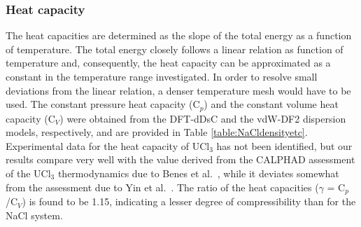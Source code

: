 \documentclass[preprint,3p,10pt,onecolumn,number,sort&compress]{elsarticle}
\begin{document}
{\subsubsection{Heat capacity} 


The heat capacities are determined as the slope of the total energy as a function of temperature. The total energy closely follows a linear relation as function of temperature and, consequently, the heat capacity can be approximated as a constant in the temperature range investigated. In order to resolve small deviations from the linear relation, a denser temperature mesh would have to be used. The constant pressure heat capacity (C$_p$) and the constant volume heat capacity (C$_V$) were obtained from the DFT-dDsC and the vdW-DF2 dispersion models, respectively, and are provided in Table \ref{table:NaCldensityetc}. Experimental data for the heat capacity of UCl$_3$ has not been identified, but our results compare very well with the value derived from the CALPHAD assessment of the UCl$_3$ thermodynamics due to Benes et al.~\cite{BENES2008}, while it deviates somewhat from the assessment due to Yin et al.~\cite{YIN2020}. The ratio of the heat capacities ($\gamma$ = C$_p$/C$_V$) is found to be 1.15, indicating a lesser degree of compressibility than for the NaCl system. 

}
\end{document}
